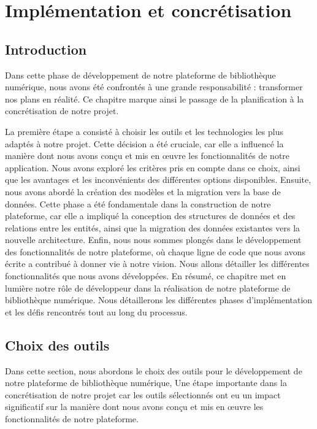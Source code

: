 \chapter{Implémentation et concrétisation}
\begin{spacing}{1.2}
\minitoc
\thispagestyle{MyStyle}
\end{spacing}
\newpage

\section*{Introduction}
Dans cette phase de développement de notre plateforme de bibliothèque numérique, nous avons été confrontés à une grande responsabilité : transformer nos plans en réalité. Ce chapitre marque ainsi le passage de la planification à la concrétisation de notre projet.\par
    La première étape a consisté à choisir les outils et les technologies les plus adaptés à notre projet. Cette décision a été cruciale, car elle a influencé la manière dont nous avons conçu et mis en œuvre les fonctionnalités de notre application. Nous avons exploré les critères pris en compte dans ce choix, ainsi que les avantages et les inconvénients des différentes options disponibles.
    Ensuite, nous avons abordé la création des modèles et la migration vers la base de données. Cette phase a été fondamentale dans la construction de notre plateforme, car elle a impliqué la conception des structures de données et des relations entre les entités, ainsi que la migration des données existantes vers la nouvelle architecture.
     Enfin, nous nous sommes plongés dans le développement des fonctionnalités de notre plateforme, où chaque ligne de code que nous avons écrite a contribué à donner vie à notre vision. Nous allons détailler les différentes fonctionnalités que nous avons développées.
   En résumé, ce chapitre met en lumière notre rôle de développeur dans la réalisation de notre plateforme de bibliothèque numérique. Nous détaillerons les différentes phases d'implémentation et les défis rencontrés tout au long du processus.

\section{Choix des outils}
Dans cette section, nous abordons le choix des outils pour le développement de notre plateforme de bibliothèque numérique, Une étape importante dans la concrétisation de notre projet car les outils sélectionnés ont eu un impact significatif sur la manière dont nous avons conçu et mis en œuvre les fonctionnalités de notre plateforme.\par

